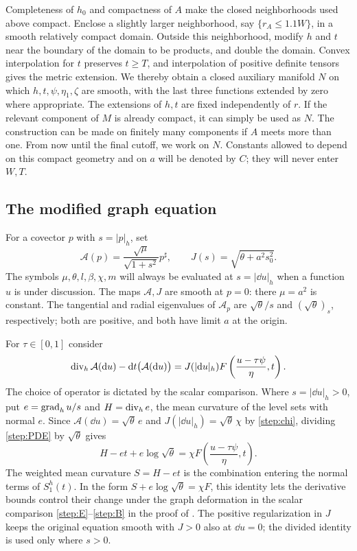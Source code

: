 Completeness of $h_0$ and compactness of $A$ make the closed neighborhoods
used above compact.  Enclose a slightly larger neighborhood, say
$\{r_A\le1.1W\}$, in a smooth relatively compact domain.  Outside this
neighborhood, modify $h$ and $t$ near the boundary of the domain to be
products, and double the domain.  Convex interpolation for $t$ preserves
$t\ge T$, and interpolation of positive definite tensors gives the
metric extension.  We thereby obtain a closed auxiliary manifold $N$
on which $h,t,\psi,\eta_1,\zeta$ are smooth, with the last three functions
extended by zero where appropriate.  The extensions of $h,t$ are fixed
independently of $r$.  If the relevant component of $M$ is already compact,
it can simply be used as $N$.  The construction can be made on finitely
many components if $A$ meets more than one.  From now until the final
cutoff, we work on $N$.  Constants allowed to depend on this compact
geometry and on $a$ will be denoted by $C$; they will never enter $W,T$.

\subsection{The modified graph equation}

For a covector $p$ with $s=|p|_h$, set
\[
 \mathcal A(p)=\frac{\sqrt\mu}{\sqrt{1+s^2}}p^\sharp,
 \qquad J(s)=\sqrt{\theta+a^2s_0^2}.
\]
The symbols $\mu,\theta,l,\beta,\chi,m$ will always be evaluated at
$s=|\dd u|_h$ when a function $u$ is under discussion.  The maps
$\mathcal A,J$ are smooth at $p=0$: there $\mu=a^2$ is constant.
The tangential and radial eigenvalues of $\mathcal A_p$ are
$\sqrt\theta/s$ and $(\sqrt\theta)_s$, respectively; both are positive,
and both have limit $a$ at the origin.

For $\tau\in[0,1]$ consider
\begin{equation}\label{step:PDE}
 \operatorname{div}_h\mathcal A(\mathrm d u)-\mathrm d t\bigl(\mathcal A(\mathrm d u)\bigr)
 =J(|\mathrm d u|_h)F\left(\frac{u-\tau\psi}{\eta},t\right).
\end{equation}
The choice of operator is dictated by the scalar comparison.  Where
$s=|\dd u|_h>0$, put $e=\operatorname{grad}_hu/s$ and $H=\operatorname{div}_he$, the mean curvature
of the level sets with normal $e$.  Since
$\mathcal A(\dd u)=\sqrt\theta\,e$ and
$J(|\dd u|_h)=\sqrt\theta\,\chi$ by \eqref{step:chi},
dividing \eqref{step:PDE} by $\sqrt\theta$ gives
\begin{equation}\label{step:geometric-equation}
 H-et+e\log\sqrt\theta
       =\chi F\left(\frac{u-\tau\psi}{\eta},t\right).
\end{equation}
The weighted mean curvature $S=H-et$ is the combination entering the
normal terms of $S^{h}_1(t)$.  In the form
$S+e\log\sqrt\theta=\chi F$, this identity lets the derivative bounds
control their change under the graph deformation in the scalar
comparison \eqref{step:E}--\eqref{step:B} in the proof of
.  The positive regularization in $J$ keeps
the original equation smooth with $J>0$ also at $\dd u=0$; the divided
identity is used only where $s>0$.

